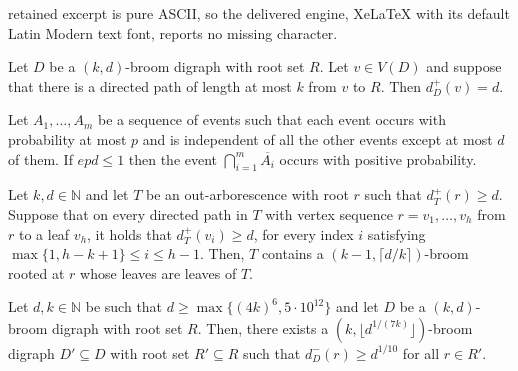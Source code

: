 \documentclass[10pt,a4paper]{amsart}
\begin{document}
retained excerpt is pure ASCII, so the delivered engine, XeLaTeX with its default Latin Modern text font, reports no missing character.
\begin{lemma}\label{lem: high degree}
    Let $D$ be a $(k,d)$-broom digraph with root set $R$. Let $v\in V(D)$ and suppose that there is a directed path of length at most $k$ from $v$ to $R$. Then $d_D^+(v)= d$.
\end{lemma}

\begin{lemma}\label{lem: lovasz local lemma}
    Let $A_1,\ldots,A_m$ be a sequence of events such that each event occurs with probability at most $p$ and is independent of all the other events except at most $d$ of them. If $epd\leq 1$ then the event $\bigcap_{i=1}^{m}\overline{A_i}$ occurs with positive probability.
\end{lemma}

\begin{lemma}\label{lem: get broom from degrees}
    Let $k, d\in \mathbb{N}$ and let $T$ be an out-arborescence with root $r$ such that $d_T^+(r) \geq d$. Suppose that on every directed path in $T$ with vertex sequence $r=v_1,\ldots,v_h$ from $r$ to a leaf $v_h$, it holds that $d_T^+(v_i)\geq d$, for every index $i$ satisfying $\max\{1,h-k+1\}\leq i\leq h-1$. Then, $T$ contains a $(k-1,\lceil d/k\rceil)$-broom rooted at $r$ whose leaves are leaves of $T$.
\end{lemma}

\begin{lemma}\label{lem: lovasz trick}
    Let $d,k\in \mathbb{N}$ be such that $d\ge \max\{(4k)^6,5\cdot 10^{12}\}$ and let $D$ be a $(k,d)$-broom digraph with root set $R$. Then, there exists a $(k,\lfloor d^{1/(7k)}\rfloor)$-broom digraph $D'\subseteq D$ with root set $R'\subseteq R$ such that $d^{-}_D(r)\geq d^{1/10}$ for all $r\in R'$.
\end{lemma}
\end{document}
